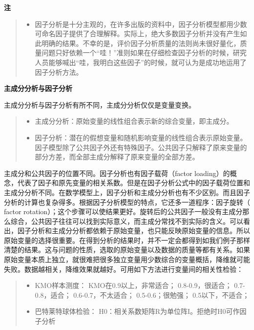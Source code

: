 \documentclass[]{ctexbook}
\providecommand{\tightlist}{%
  \setlength{\itemsep}{0pt}\setlength{\parskip}{0pt}}
\begin{document}
\textbf{注}

\begin{quote}
\begin{itemize}
\tightlist
\item
  因子分析是十分主观的，在许多出版的资料中，因子分析模型都用少数可命名因子提供了合理解释。实际上，绝大多数因子分析并没有产生如此明确的结果。不幸的是，评价因子分析质量的法则尚未很好量化，质量问题只好依赖一个``哇！''准则如果在仔细检查因子分析的时候，研究人员能够喊出``哇，我明白这些因子''的时候，就可认为是成功地运用了因子分析方法。
\end{itemize}
\end{quote}

\textbf{主成分分析与因子分析}

主成分分析与因子分析有所不同，主成分分析仅仅是变量变换。

\begin{quote}
\begin{itemize}
\tightlist
\item
  主成分分析：原始变量的线性组合表示新的综合变量，即主成分。
\item
  因子分析：潜在的假想变量和随机影响变量的线性组合表示原始变量。因子模型除了公共因子外还有特殊因子。公共因子只解释了原来变量的部分方差，而全部主成分解释了原来变量的全部方差。
\end{itemize}
\end{quote}

主成分和公共因子的位置不同。因子分析也有因子载荷（factor loading）的概念，代表了因子和原先变量的相关系数。但是在因子分析公式中的因子载荷位置和主成分分析不同。在数学模型上，因子分析和主成分分析也有不少区别。而且因子分析的计算也复杂得多。根据因子分析模型的特点，它还多一道程序：因子旋转（ factor rotation）；这个步骤可以使结果更好。旋转后的公共因子一般没有主成分那么综合，公共因子往往可以找到实际意义，而主成分常找不到实际的含义。可以看出，因子分析和主成分分析都依赖于原始变量，也只能反映原始变量的信息。所以原始变量的选择很重要。在得到分析的结果时，并不一定会都得到如我们例子那样清楚的结果。这与问题的性质，选取的原始变量以及数据的质量等都有关系。如果原始变量本质上独立，就很难把很多独立变量用少数综合的变量概括，降维就可能失败。数据越相关，降维效果就越好。可用如下方法进行变量间的相关性检验：

\begin{quote}
\begin{itemize}
\tightlist
\item
  KMO样本测度： KMO在0.9以上，非常适合； 0.8-0.9，很适合； 0.7-0.8，适合； 0.6-0.7，不太适合；
  0.5-0.6；很勉强； 0.5以下，不适合；
\item
  巴特莱特球体检验： H0：相关系数矩阵R为单位阵I。拒绝时H0可作因子分析
\end{itemize}
\end{quote}
\end{document}
